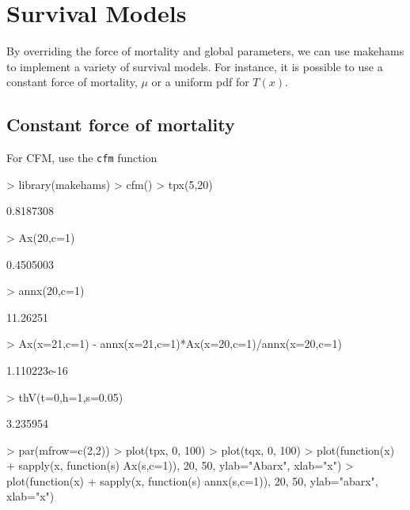 \documentclass[12pt]{article}
\begin{document}


\section{Survival Models}
By overriding the force of mortality and global parameters, we can use makehams to implement a variety of survival models. For instance, it is possible to use a constant force of mortality, $\mu$ or a uniform pdf for $T(x)$.

\subsection{Constant force of mortality}
For CFM, use the \texttt{cfm} function
\begin{Schunk}
\begin{Sinput}
> library(makehams)
> cfm()
> tpx(5,20)
\end{Sinput}
\begin{Soutput}
[1] 0.8187308
\end{Soutput}
\begin{Sinput}
> Ax(20,c=1)
\end{Sinput}
\begin{Soutput}
[1] 0.4505003
\end{Soutput}
\begin{Sinput}
> annx(20,c=1)
\end{Sinput}
\begin{Soutput}
[1] 11.26251
\end{Soutput}
\begin{Sinput}
> Ax(x=21,c=1) - annx(x=21,c=1)*Ax(x=20,c=1)/annx(x=20,c=1)
\end{Sinput}
\begin{Soutput}
[1] 1.110223e-16
\end{Soutput}
\begin{Sinput}
> thV(t=0,h=1,s=0.05)
\end{Sinput}
\begin{Soutput}
[1] 3.235954
\end{Soutput}
\begin{Sinput}
> par(mfrow=c(2,2))
> plot(tpx, 0, 100)
> plot(tqx, 0, 100)
> plot(function(x) 
+   sapply(x, function(s) Ax(s,c=1)), 20, 50, ylab="Abarx", xlab="x")
> plot(function(x) 
+   sapply(x, function(s) annx(s,c=1)), 20, 50, ylab="abarx", xlab="x")
\end{Sinput}
\end{Schunk}
\end{document}
